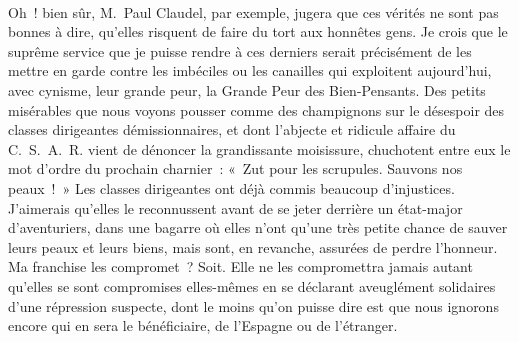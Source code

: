 \documentclass[french,twoside]{book} %
\newcommand{\astertri}{\medskip\par\centerline{\color{rubric}\large\selectfont{\syms ✻\,✻\,✻}}\medskip\par}%
\begin{document}
\astertri

\noindent  \par
Oh ! bien sûr, M. Paul Claudel, par exemple, jugera que ces vérités ne sont pas bonnes à dire, qu’elles risquent de faire du tort aux honnêtes gens. Je crois que le suprême service que je puisse rendre à ces derniers serait précisément de les mettre en garde contre les imbéciles ou les canailles qui exploitent aujourd’hui, avec cynisme, leur grande peur, la Grande Peur des Bien-Pensants. Des petits misérables que nous voyons pousser comme des champignons sur le désespoir des classes dirigeantes démissionnaires, et dont l’abjecte et ridicule affaire du C. S. A. R. vient de dénoncer la grandissante moisissure, chuchotent entre eux le mot d’ordre du prochain charnier : « Zut pour les scrupules. Sauvons nos peaux ! » Les classes dirigeantes ont déjà commis beaucoup d’injustices. J’aimerais qu’elles le reconnussent avant de se jeter derrière un état-major d’aventuriers, dans une bagarre où elles n’ont qu’une très petite chance de sauver leurs peaux et leurs biens, mais sont, en revanche, assurées de perdre l’honneur. Ma franchise les compromet ? Soit. Elle ne les compromettra jamais autant qu’elles se sont compromises elles-mêmes en se déclarant aveuglément solidaires d’une répression suspecte, dont le moins qu’on puisse dire est que nous ignorons encore qui en sera le bénéficiaire, de l’Espagne ou de l’étranger.\par
\end{document}
